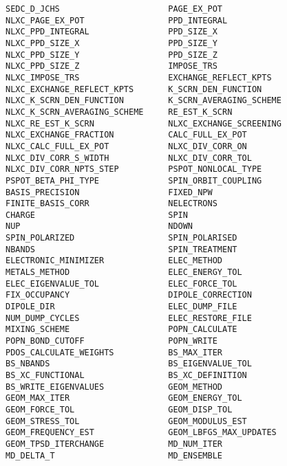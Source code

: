 \documentclass[a4paper, 10pt]{article}
\begin{document}
\begin{lstlisting}[numbers=right]
SEDC_D_JCHS                      PAGE_EX_POT                    
NLXC_PAGE_EX_POT                 PPD_INTEGRAL                   
NLXC_PPD_INTEGRAL                PPD_SIZE_X                     
NLXC_PPD_SIZE_X                  PPD_SIZE_Y                     
NLXC_PPD_SIZE_Y                  PPD_SIZE_Z                     
NLXC_PPD_SIZE_Z                  IMPOSE_TRS                     
NLXC_IMPOSE_TRS                  EXCHANGE_REFLECT_KPTS          
NLXC_EXCHANGE_REFLECT_KPTS       K_SCRN_DEN_FUNCTION             
NLXC_K_SCRN_DEN_FUNCTION         K_SCRN_AVERAGING_SCHEME         
NLXC_K_SCRN_AVERAGING_SCHEME     RE_EST_K_SCRN                   
NLXC_RE_EST_K_SCRN               NLXC_EXCHANGE_SCREENING         
NLXC_EXCHANGE_FRACTION           CALC_FULL_EX_POT                
NLXC_CALC_FULL_EX_POT            NLXC_DIV_CORR_ON                
NLXC_DIV_CORR_S_WIDTH            NLXC_DIV_CORR_TOL               
NLXC_DIV_CORR_NPTS_STEP          PSPOT_NONLOCAL_TYPE             
PSPOT_BETA_PHI_TYPE              SPIN_ORBIT_COUPLING 
BASIS_PRECISION                  FIXED_NPW                       
FINITE_BASIS_CORR                NELECTRONS                      
CHARGE                           SPIN                            
NUP                              NDOWN                           
SPIN_POLARIZED                   SPIN_POLARISED                  
NBANDS                           SPIN_TREATMENT                  
ELECTRONIC_MINIMIZER             ELEC_METHOD                     
METALS_METHOD                    ELEC_ENERGY_TOL                 
ELEC_EIGENVALUE_TOL              ELEC_FORCE_TOL                  
FIX_OCCUPANCY                    DIPOLE_CORRECTION               
DIPOLE_DIR                       ELEC_DUMP_FILE                  
NUM_DUMP_CYCLES                  ELEC_RESTORE_FILE               
MIXING_SCHEME                    POPN_CALCULATE                  
POPN_BOND_CUTOFF                 POPN_WRITE                      
PDOS_CALCULATE_WEIGHTS           BS_MAX_ITER                     
BS_NBANDS                        BS_EIGENVALUE_TOL               
BS_XC_FUNCTIONAL                 BS_XC_DEFINITION                
BS_WRITE_EIGENVALUES             GEOM_METHOD                     
GEOM_MAX_ITER                    GEOM_ENERGY_TOL                 
GEOM_FORCE_TOL                   GEOM_DISP_TOL                   
GEOM_STRESS_TOL                  GEOM_MODULUS_EST                
GEOM_FREQUENCY_EST               GEOM_LBFGS_MAX_UPDATES          
GEOM_TPSD_ITERCHANGE             MD_NUM_ITER                     
MD_DELTA_T                       MD_ENSEMBLE                     

\end{lstlisting}
\end{document}
